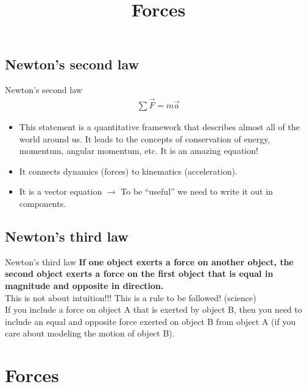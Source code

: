 \documentclass[aspectratio=169,
hyperref={colorlinks,urlcolor=blue}
]{beamer}
\begin{document}
\subsection{Newton's second law}
\label{subsec:newtonssecondlaw}
\begin{frame}{Newton's second law}
\begin{align*}
\sum \vec F = m\vec a
\end{align*}
\begin{itemize}
\item This statement is a quantitative framework that describes almost all of the world around us. It leads to the concepts of conservation of energy, momentum, angular momentum, etc. It is an amazing equation!
\item It connects dynamics (forces) to kinematics (acceleration).
\item It is a vector equation $\rightarrow$ To be ``useful'' we need to write it out in components. 
\end{itemize}
\end{frame}

\subsection{Newton's third law}
\label{subsec:newtonsthirdlaw}
\begin{frame}{Newton's third law}
\textbf{If one object exerts a force on another object, the second object
exerts a force on the first object that is equal in magnitude and
opposite in direction.}\\
\vfill
This is not about intuition!!! \textcolor{myred}{This is a rule to be followed!} (science)\\
\vfill
If you include a force on object A that is exerted by object B, then you need to include an equal and opposite force exerted on object B from object A (if you care about modeling the motion of object B).
\end{frame}




\section{Forces}
\label{sec:forces}
\title{Forces}
\author{\insertsubsection}



\begin{frame}
\titlepage
\thispagestyle{empty}
\end{frame}
\end{document}
